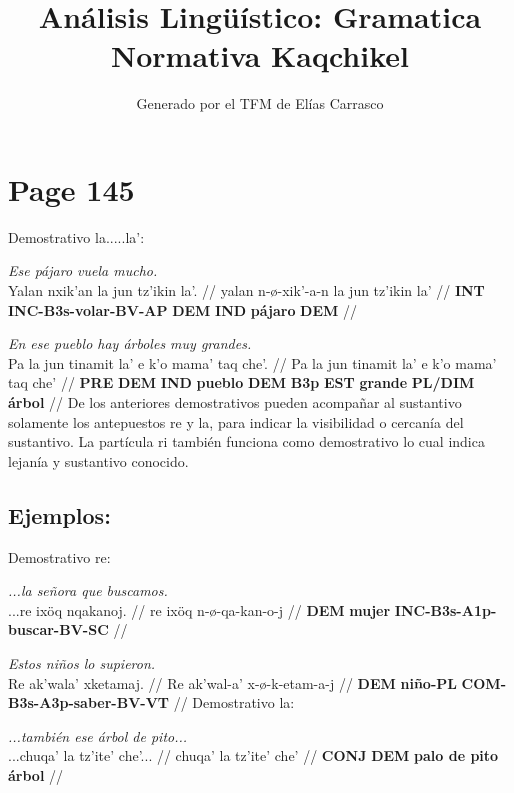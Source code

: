 \documentclass{article}%
\title{Análisis Lingüístico: Gramatica Normativa Kaqchikel}%
\author{Generado por el TFM de Elías Carrasco}%
\begin{document}
%
\normalsize%
\maketitle%
\section{Page 145}%
\label{sec:Page145}%
Demostrativo la.....la': %
\par\medskip%
\ex
\textit{Ese pájaro vuela mucho.} \\
\begingl
\gla Yalan nxik'an la jun tz'ikin la'. //
\glb yalan n-ø-xik'-a-n la jun tz'ikin la' //
\glc \textbf{INT} \textbf{INC-B3s-volar-BV-AP} \textbf{DEM} \textbf{IND} \textbf{pájaro} \textbf{DEM} //
\endgl
\xe
%
\medskip%
\par\medskip%
\ex
\textit{En ese pueblo hay árboles muy grandes.} \\
\begingl
\gla Pa la jun tinamit la' e k'o mama' taq che'. //
\glb Pa la jun tinamit la' e k'o mama' taq che' //
\glc \textbf{PRE} \textbf{DEM} \textbf{IND} \textbf{pueblo} \textbf{DEM} \textbf{B3p} \textbf{EST} \textbf{grande} \textbf{PL/DIM} \textbf{árbol} //
\endgl
\xe
%
\medskip%
De los anteriores demostrativos pueden acompañar al sustantivo solamente los antepuestos re y la, para indicar la visibilidad o cercanía del sustantivo. La partícula ri también funciona como demostrativo lo cual indica lejanía y sustantivo conocido. %
\subsection{Ejemplos:}%
\label{subsec:Ejemplos}%

%
Demostrativo re: %
\par\medskip%
\ex
\textit{...la señora que buscamos.} \\
\begingl
\gla ...re ixöq nqakanoj. //
\glb re ixöq n-ø-qa-kan-o-j //
\glc \textbf{DEM} \textbf{mujer} \textbf{INC-B3s-A1p-buscar-BV-SC} //
\endgl
\xe
%
\medskip%
\par\medskip%
\ex
\textit{Estos niños lo supieron.} \\
\begingl
\gla Re ak'wala' xketamaj. //
\glb Re ak'wal-a' x-ø-k-etam-a-j //
\glc \textbf{DEM} \textbf{niño-PL} \textbf{COM-B3s-A3p-saber-BV-VT} //
\endgl
\xe
%
\medskip%
Demostrativo la: %
\par\medskip%
\ex
\textit{...también ese árbol de pito...} \\
\begingl
\gla ...chuqa' la tz'ite' che'... //
\glb chuqa' la tz'ite' che' //
\glc \textbf{CONJ} \textbf{DEM} \textbf{palo de pito} \textbf{árbol} //
\endgl
\xe
%
\medskip

%
\end{document}
